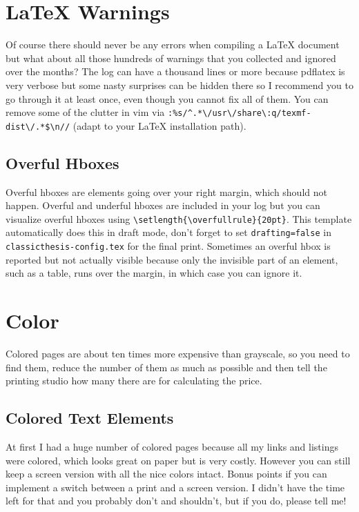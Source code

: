 \section{LaTeX Warnings}
Of course there should never be any errors when compiling a LaTeX document but what about all those hundreds of warnings that you collected and ignored over the months?
The log can have a thousand lines or more because pdflatex is very verbose but some nasty surprises can be hidden there so I recommend you to go through it at least once, even though you cannot fix all of them.
You can remove some of the clutter in vim via \verb+:%s/^.*\/usr\/share\:q/texmf-dist\/.*$\n//+ (adapt to your LaTeX installation path).

\subsection{Overful Hboxes}
Overful hboxes are elements going over your right margin, which should not happen.
Overful and underful hboxes are included in your log but you can visualize overful hboxes using \verb+\setlength{\overfullrule}{20pt}+.
This template automatically does this in draft mode, don't forget to set \verb+drafting=false+ in \verb+classicthesis-config.tex+ for the final print.
Sometimes an overful hbox is reported but not actually visible because only the invisible part of an element, such as a table, runs over the margin, in which case you can ignore it.

\section{Color}
Colored pages are about ten times more expensive than grayscale, so you need to find them, reduce the number of them as much as possible and then tell the printing studio how many there are for calculating the price.

\subsection{Colored Text Elements }
At first I had a huge number of colored pages because all my links and listings were colored, which looks great on paper but is very costly.
However you can still keep a screen version with all the nice colors intact.
Bonus points if you can implement a switch between a print and a screen version.
I didn't have the time left for that and you probably don't and shouldn't, but if you do, please tell me!

